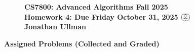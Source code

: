 \documentclass[11pt]{article}
\theoremstyle{definition}
\newcommand{\HWtitle}[2]{\begin{figure}[t!]{\bfseries \Large \color{DarkBlue}  \noindent CS7800: Advanced Algorithms \hfill Fall 2025} \\[0.2em] {\bfseries \Large \color{DarkBlue} Homework #1: Due {#2}} \\[1em] {\bfseries \large Jonathan Ullman}\\[1ex] \end{figure}}
\begin{document}

\HWtitle{4}{Friday October 31, 2025 $\bigpumpkin$}


\renewcommand{\labelenumii}{{\bfseries \em \arabic{enumi}.\arabic{enumii}}}
\newcommand{\problemitem}{\renewcommand{\labelenumi}{{\bfseries \em Problem \arabic{enumi}}}\item}
\newcommand{\solutionitem}{\renewcommand{\labelenumi}{{\bfseries \em Solution \arabic{enumi}}}\addtocounter{enumi}{-1}\item}

\noindent\textbf{\color{blue} Assigned Problems (Collected and Graded)}
\end{document}
